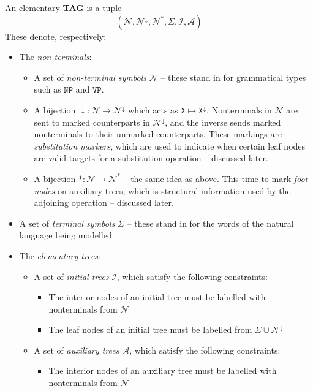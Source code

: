 \begin{defn}
An elementary \textbf{TAG} is a tuple
\[(\mathcal{N}, \mathcal{N}^\downarrow, \mathcal{N}^*, \Sigma, \mathcal{I}, \mathcal{A})\]
These denote, respectively:
\begin{itemize}
	\item{ The \emph{non-terminals}:
		\begin{itemize}
			\item{A set of \emph{non-terminal symbols} $\mathcal{N}$ -- these stand in for grammatical types such as $\texttt{NP}$ and $\texttt{VP}$.}
			\item{A bijection $\downarrow: \mathcal{N} \rightarrow \mathcal{N}^\downarrow$ which acts as $\texttt{X} \mapsto \texttt{X}^\downarrow$. Nonterminals in $\mathcal{N}$ are sent to marked counterparts in $\mathcal{N}^\downarrow$, and the inverse sends marked nonterminals to their unmarked counterparts. These markings are \emph{substitution markers}, which are used to indicate when certain leaf nodes are valid targets for a substitution operation -- discussed later.}
			\item{A bijection $*: \mathcal{N} \rightarrow \mathcal{N}^*$ -- the same idea as above. This time to mark \emph{foot nodes} on auxiliary trees, which is structural information used by the adjoining operation -- discussed later.}
	\end{itemize}
	}
	\item{A set of \emph{terminal symbols} $\Sigma$ -- these stand in for the words of the natural language being modelled.}
	\item{The \emph{elementary trees}:
		\begin{itemize}
			\item{A set of \emph{initial trees} $\mathcal{I}$, which satisfy the following constraints:
			\begin{itemize}
				\item{The interior nodes of an initial tree must be labelled with nonterminals from $\mathcal{N}$}
				\item{The leaf nodes of an initial tree must be labelled from $\Sigma \cup \mathcal{N}^{\downarrow}$}
			\end{itemize}
			}
	\item{A set of \emph{auxiliary trees} $\mathcal{A}$, which satisfy the following constraints:
		\begin{itemize}
			\item{The interior nodes of an auxiliary tree must be labelled with nonterminals from $\mathcal{N}$}

\end{itemize}}
\end{itemize}}
\end{itemize}
\end{defn}
